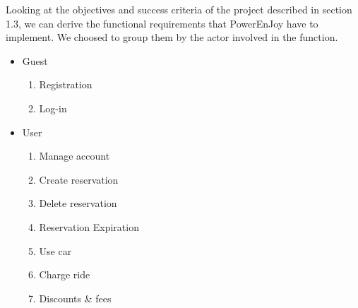 Looking at the objectives and success criteria of the project described in section 1.3, we can derive the functional requirements that PowerEnJoy have to implement. We choosed to group them by the actor involved in the function.
\begin{itemize}
  \item Guest
  \begin{enumerate}
    \item Registration
    \item Log-in
  \end{enumerate}
  \item User
  \begin{enumerate}
    \item Manage account
    \item Create reservation
    \item Delete reservation
    \item Reservation Expiration
    \item Use car
    \item Charge ride
    \item Discounts \& fees
  \end{enumerate}
\end{itemize}

